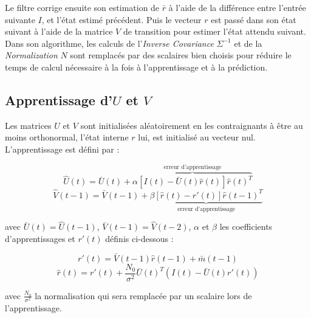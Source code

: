 Le filtre corrige ensuite son estimation de $\bar{r}$ à l'aide de la
différence entre l'entrée suivante $I$, et l'état estimé précédent. Puis le
vecteur $r$ est passé dans son état suivant à l'aide de la matrice $V$ de
transition pour estimer l'état attendu suivant.\\

Dans son algorithme, les calculs de l'\textit{Inverse Covariance} $\Sigma^{-1}$
et de la \textit{Normalization} $N$ sont remplacés par des scalaires bien
choisis %
pour réduire le temps de calcul nécessaire à la fois à
l'apprentissage et à la prédiction.


\subsection{Apprentissage d'$U$ et $V$} %
\label{sub:Apprentissage de U et V}

Les matrices $U$ et $V$ sont initialisées aléatoirement en les contraignants
à être au moins orthonormal, l'état interne $r$ lui, est initialisé au vecteur
nul. L'apprentissage est défini par :

\begin{equation}
   \label{eqn:learning_U}
   \hat{U}(t) = \bar{U}(t) + \overbrace{\alpha[I(t) - \bar{U}(t)\hat{r}(t)]\hat{r}(t)^T}^\text{erreur d'apprentissage}
\end{equation}
\begin{equation}
   \label{eqn:learning_V}
   \hat{V}(t-1) = \bar{V}(t-1) + \underbrace{\beta[\hat{r}(t) - r'(t)]\hat{r}(t-1)^T}_\text{erreur d'apprentissage}
\end{equation}

avec $\bar{U}(t) = \hat{U}(t-1)$, $\bar{V}(t-1) = \hat{V}(t-2)$, $\alpha$ et
$\beta$ les coefficients d'apprentissages et $r'(t)$ définis ci-dessous :

\begin{equation}
   \label{eqn:def_r_prime}
   r'(t) =  \bar{V}(t-1)\hat{r}(t-1) + \bar{m}(t-1)
\end{equation}
\begin{equation}
   \label{eqn:def_r_hat}
   \hat{r}(t) = r'(t) + \frac{N_0}{\sigma^2}\bar{U}(t)^T(I(t)-\bar{U}(t)r'(t))
\end{equation}

avec $\frac{N_0}{\sigma^2}$ la normalisation qui sera remplacée par un scalaire lors
de l'apprentissage.


